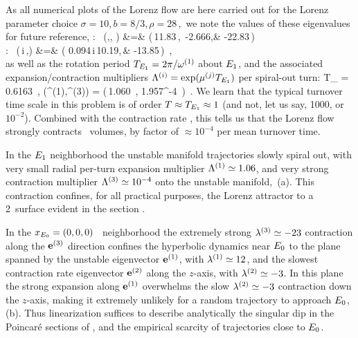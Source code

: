 As all numerical plots of the Lorenz flow are
here carried out for the Lorenz parameter choice
\(
    \sigma = 10, b= 8/3, \rho = 28
\,,
\)
we note the values of these eigenvalues for future reference,
\beq
{}
:~
(\eigExp[1],\eigExp[2], \eigExp[3])
    &=& (\,11.83\,,~-2.666,& -22.83\,)   \\
:~
(\eigRe[1] \pm\,i\,\eigIm[1],\eigExp[3])
    &=& (\,\,0.094\,\pm i\,10.19,\,& -13.85\,) \,, \\
\earr
\label{EqLorenzStab}
\eeq
as
well as the rotation period
$T_{\EQV{1}} = 2\pi/\eigIm[1]$ about $\EQV{1}$,
and the  associated expansion/contraction multipliers
$\ExpaEig^{(i)} = \exp(\eigRe[j] T_{\EQV{1}})$
per spiral-out turn:
\beq
T_{} =  0.6163 \,, \qquad
(\ExpaEig^{(1)},\ExpaEig^{(3)})
   = (\,1.060 \,, 1.957^{-4} \,)
\,.
\label{EqLorenzMltp}
\eeq
We learn that the typical turnover time scale in this problem is
of order $T \approx T_{\EQV{1}} \approx 1$
(and not, let us say, 1000, or $10^{-2}$). Combined with
the contraction rate , this tells us that
the Lorenz flow strongly contracts \statesp\ volumes, by factor of
$ \approx 10^{-4}$ per mean turnover time.

In the $\EQV{1}$ neighborhood the unstable manifold
trajectories slowly spiral out, with
very small radial  per-turn expansion multiplier
$\ExpaEig^{(1)} \simeq  1.06$,
and very strong contraction multiplier
$\ExpaEig^{(3)}  \simeq 10^{-4}$
onto the unstable manifold,
\,(a).
This contraction confines, for all practical purposes,
the Lorenz attractor to a 2\dmn\ surface
evident in the section .


In the $\ssp_{\EQV{0}} = (0,0,0)$ \eqv\ neighborhood the extremely strong
$\eigExp[3] \simeq -23$ contraction along the $\jEigvec[3]$ direction
confines the hyperbolic dynamics near $\EQV{0}$ to the plane
spanned by the unstable eigen\-vector $\jEigvec[1]$,
with $\eigExp[1] \simeq 12$, and
the slowest contraction rate eigen\-vector $\jEigvec[2]$
along the $z$-axis, with $\eigExp[2] \simeq - 3$.
In this plane the strong expansion %
along $\jEigvec[1]$ overwhelms the
slow  $\eigExp[2] \simeq - 3$ contraction down the $z$-axis,
making it extremely unlikely for a random trajectory
to approach $\EQV{0}$, \,(b).
Thus linearization suffices to describe analytically the singular
dip in the Poincar\'e sections of
, and the empirical scarcity
of trajectories close to $\EQV{0}$.

